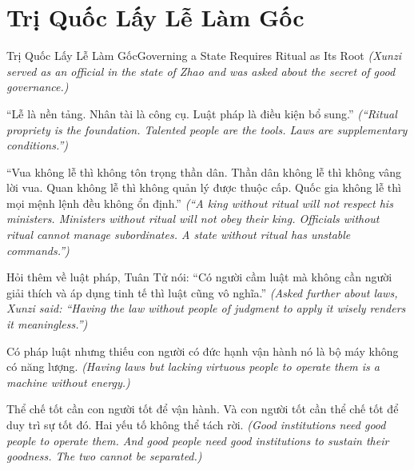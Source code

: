 \section{Trị Quốc Lấy Lễ Làm Gốc}
\begin{truyen}{Trị Quốc Lấy Lễ Làm Gốc}{Governing a State Requires Ritual as Its Root}
\textit{(Xunzi served as an official in the state of Zhao and was asked about the secret of good governance.)}

``Lễ là nền tảng. Nhân tài là công cụ. Luật pháp là điều kiện bổ sung.''
\textit{(``Ritual propriety is the foundation. Talented people are the tools. Laws are supplementary conditions.'')}

``Vua không lễ thì không tôn trọng thần dân. Thần dân không lễ thì không vâng lời vua. Quan không lễ thì không quản lý được thuộc cấp. Quốc gia không lễ thì mọi mệnh lệnh đều không ổn định.''
\textit{(``A king without ritual will not respect his ministers. Ministers without ritual will not obey their king. Officials without ritual cannot manage subordinates. A state without ritual has unstable commands.'')}

Hỏi thêm về luật pháp, Tuân Tử nói: ``Có người cầm luật mà không cần người giải thích và áp dụng tinh tế thì luật cũng vô nghĩa.''
\textit{(Asked further about laws, Xunzi said: ``Having the law without people of judgment to apply it wisely renders it meaningless.'')}

Có pháp luật nhưng thiếu con người có đức hạnh vận hành nó là bộ máy không có năng lượng.
\textit{(Having laws but lacking virtuous people to operate them is a machine without energy.)}

\end{truyen}

\begin{baihoc}
Thể chế tốt cần con người tốt để vận hành. Và con người tốt cần thể chế tốt để duy trì sự tốt đó. Hai yếu tố không thể tách rời.
\textit{(Good institutions need good people to operate them. And good people need good institutions to sustain their goodness. The two cannot be separated.)}
\end{baihoc}
\ngancach

